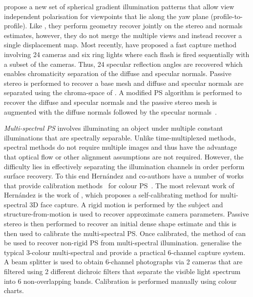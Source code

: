 \citet{ghosh2011multiview} propose a new set of spherical gradient
illumination patterns that allow view independent polarisation
for viewpoints that lie along the yaw plane (profile-to-profile). Like
\citet{fyffe2011comprehensive}, they perform geometry recover jointly
on the stereo and normals estimates, however, they do not merge the multiple
views and instead recover a single displacement map. Most recently,
\citet{fyffe2016near} have proposed a fast capture method involving 24 cameras
and six ring lights where each flash is fired sequentially with a subset
of the cameras. Thus, 24 specular reflection angles are recovered which
enables chromaticity separation of the diffuse and specular normals. Passive
stereo is performed to recover a base mesh and diffuse and specular normals
are separated using the chroma-space of \citet{zickler2008color}. A modified
PS algorithm is performed to recover the diffuse and specular normals and
the passive stereo mesh is augmented with the diffuse normals followed
by the specular normals~\cite{nehab2005efficiently}.

\textit{Multi-spectral PS} involves illuminating an object under
multiple constant illuminations that are spectrally separable. Unlike
time-multiplexed methods, spectral methods do not require multiple images
and thus have the advantage that optical flow or other alignment assumptions
are not required. However, the difficulty lies in effectively separating the
illumination channels in order perform surface recovery. To this end
Hern{\'a}ndez and co-authors have a number of works that provide
calibration methods~\cite{vogiatzis2012self,hernandez2008multiview,brostow2011video}
for colour PS~\cite{drew1992shape}. The most relevant work of Hern{\'a}ndez
is the work of \citet{vogiatzis2012self}, which proposes a self-calibrating
method for multi-spectral 3D face capture. A rigid motion is performed by
the subject and structure-from-motion is used to recover approximate camera
parameters. Passive stereo is then performed to recover an initial dense
shape estimate and this is then used to calibrate the multi-spectral PS.\@
Once calibrated, the method of \citet{brostow2011video} can be used to
recover non-rigid PS from multi-spectral illumination.
\citet{fyffe2011single} generalise the typical 3-colour multi-spectral
and provide a practical 6-channel capture system. A beam splitter is used
to obtain 6-channel photographs via 2 cameras that are filtered using
2 different dichroic filters that separate the visible light spectrum
into 6 non-overlapping bands. Calibration is performed manually using colour
charts.

